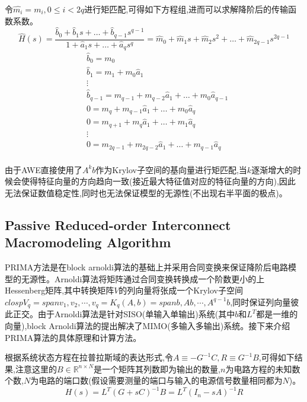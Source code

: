 \documentclass[12pt]{article}
\begin{document}
\begin{sloppypar}
\qquad 令$\hat{m_i} = m_i, 0 \le i < 2q$进行矩匹配,可得如下方程组,进而可以求解降阶后的传输函数系数。
\begin{equation}
  \hat{H}(s)=\frac{\hat{b}_0+\hat{b}_1 s+\ldots+\hat{b}_{q-1} s^{q-1}}{1+\hat{a}_1 s+\ldots+\hat{a}_q s^q} =\hat{m}_0 + \hat{m}_1 s  + \hat{m}_2 s^2 + \ldots + \hat{m}_{2q-1} s^{2q-1}
\end{equation}
\begin{equation}
  \begin{align}
    &\hat{b}_0=m_0 \\
    &\hat{b}_1=m_1+m_0 \hat{a}_1 \\
    &\vdots \\
    &\hat{b}_{q-1}=m_{q-1}+m_{q-2} \hat{a}_1+\ldots+m_0 \hat{a}_{q-1} \\
    &0=m_q+m_{q-1} \hat{a}_1+\ldots+m_0 \hat{a}_q \\
    &0=m_{q+1}+m_q \hat{a}_1+\ldots+m_1 \hat{a}_q \\
    &\vdots \\
    &0=m_{2 q-1}+m_{2 q-2} \hat{a}_1+\ldots+m_{q-1} \hat{a}_q \\
  \end{align}
\end{equation}

\qquad 由于AWE直接使用了$A^kb$作为Krylov子空间的基向量进行矩匹配,当$k$逐渐增大的时候会使得特征向量的方向趋向一致(接近最大特征值对应的特征向量的方向),因此无法保证数值稳定性,同时也无法保证模型的无源性(不出现右半平面的极点)。

\subsection{Passive Reduced-order Interconnect Macromodeling Algorithm}

\qquad PRIMA方法是在block arnoldi算法的基础上并采用合同变换来保证降阶后电路模型的无源性。Arnoldi算法将矩阵通过合同变换转换成一个阶数更小的上Hessenberg矩阵,其中转换矩阵$V$的列向量将张成一个Krylov子空间$closp V_q = span { v_1,v_2,\cdots,v_q }=K_q(A,b)=span { b,Ab,\cdots,A^{q-1}b }$,同时保证列向量彼此正交。由于Arnoldi算法是针对SISO(单输入单输出)系统(其中$b$和$L^T$都是一维的向量),block Arnoldi算法的提出解决了MIMO(多输入多输出)系统。接下来介绍PRIMA算法的具体原理和计算方法。

\qquad 根据系统状态方程在拉普拉斯域的表达形式,令$A \equiv -G^{-1}C, R \equiv G^{-1}B$,可得如下结果,注意这里的$B \in \mathbb{R}^{n \times N}$是一个矩阵其列数即为输出的数量,$n$为电路方程的未知数个数,$N$为电路的端口数(假设需要测量的端口与输入的电源信号数量相同都为$N$)。
\begin{equation}
  H(s)=L^T(G+sC)^{-1}B=L^T(I_n-sA)^{-1}R
\end{equation}


\end{sloppypar}
\end{document}
